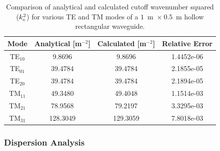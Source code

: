 \begin{table}[b]
 \centering
    \caption{Comparison of analytical and calculated cutoff wavenumber squared ($k_{c}^{2}$) for various TE and TM modes of a $1$~m~$\times~0.5$~m hollow rectangular waveguide.}
    \label{tab:rectangular_cutoff_comparison}
    \begin{tabular}{|c|c|c|c|}
    \hline
    Mode & Analytical [m$^{-2}$] & Calculated [m$^{-2}$] & Relative Error \\
    \hline
    TE$_{10}$ & 9.8696 & 9.8696 & 1.4452e-06\\
    TE$_{01}$ & 39.4784 & 39.4784 & 2.1855e-05\\
    TE$_{20}$ & 39.4784 & 39.4784 & 2.1894e-05\\
    \hline
    TM$_{11}$ & 49.3480 & 49.4048 & 1.1514e-03 \\
    TM$_{21}$ & 78.9568 & 79.2197 & 3.3295e-03\\
    TM$_{31}$ & 128.3049 & 129.3059 & 7.8018e-03\\
    \hline 
    \end{tabular}
\end{table}
\clearpage
\subsubsection{Dispersion Analysis}

